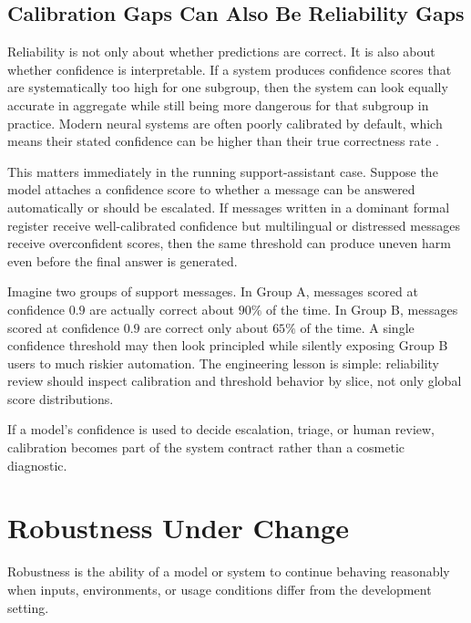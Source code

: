 \subsection{Calibration Gaps Can Also Be Reliability Gaps}

Reliability is not only about whether predictions are correct. It is also about whether confidence is interpretable. If a system produces confidence scores that are systematically too high for one subgroup, then the system can look equally accurate in aggregate while still being more dangerous for that subgroup in practice. Modern neural systems are often poorly calibrated by default, which means their stated confidence can be higher than their true correctness rate \citep{guo2017}.

This matters immediately in the running support-assistant case. Suppose the model attaches a confidence score to whether a message can be answered automatically or should be escalated. If messages written in a dominant formal register receive well-calibrated confidence but multilingual or distressed messages receive overconfident scores, then the same threshold can produce uneven harm even before the final answer is generated.

\begin{example}
Imagine two groups of support messages. In Group A, messages scored at confidence $0.9$ are actually correct about $90\%$ of the time. In Group B, messages scored at confidence $0.9$ are correct only about $65\%$ of the time. A single confidence threshold may then look principled while silently exposing Group B users to much riskier automation. The engineering lesson is simple: reliability review should inspect calibration and threshold behavior by slice, not only global score distributions.
\end{example}

\begin{practicalnote}
If a model's confidence is used to decide escalation, triage, or human review, calibration becomes part of the system contract rather than a cosmetic diagnostic.
\end{practicalnote}

\section{Robustness Under Change}

\begin{definition}[Robustness]
Robustness is the ability of a model or system to continue behaving reasonably when inputs, environments, or usage conditions differ from the development setting.
\end{definition}

